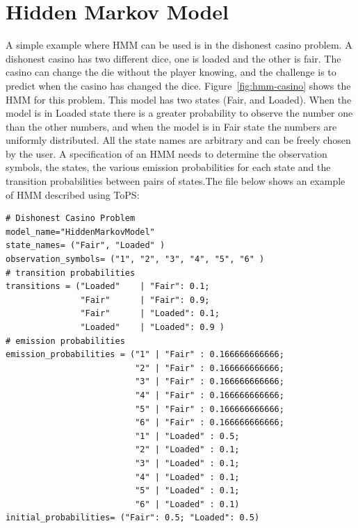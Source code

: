 \section{Hidden Markov Model}

A simple example where HMM can be used is in the dishonest casino problem. A dishonest casino has two different dice, one is loaded and the other is fair. The casino can change the die without the player knowing, and the challenge is to predict when the casino has changed the dice.  Figure~\ref{fig:hmm-casino} shows the HMM for this problem.  This model has two states (Fair, and Loaded). When the model is in Loaded state there is a greater probability to observe the number one than the other numbers,  and when the model is in Fair state the numbers are uniformly distributed. All the state names are arbitrary and can be freely chosen by the user. A specification of an HMM needs to determine the observation symbols, the states, the various emission probabilities for each state and the transition probabilities between pairs of states.The file below shows an example of HMM described using ToPS:


\begin{Verbatim}[frame=single,label="hmm.txt"]
# Dishonest Casino Problem
model_name="HiddenMarkovModel"
state_names= ("Fair", "Loaded" )
observation_symbols= ("1", "2", "3", "4", "5", "6" )
# transition probabilities
transitions = ("Loaded"    | "Fair": 0.1;
               "Fair"      | "Fair": 0.9;
               "Fair"      | "Loaded": 0.1;
               "Loaded"    | "Loaded": 0.9 )
# emission probabilities
emission_probabilities = ("1" | "Fair" : 0.166666666666; 
                          "2" | "Fair" : 0.166666666666;  
                          "3" | "Fair" : 0.166666666666; 
                          "4" | "Fair" : 0.166666666666; 
                          "5" | "Fair" : 0.166666666666; 
                          "6" | "Fair" : 0.166666666666; 
                          "1" | "Loaded" : 0.5;            
                          "2" | "Loaded" : 0.1;            
                          "3" | "Loaded" : 0.1;            
                          "4" | "Loaded" : 0.1;            
                          "5" | "Loaded" : 0.1;            
                          "6" | "Loaded" : 0.1)            
initial_probabilities= ("Fair": 0.5; "Loaded": 0.5)

\end{Verbatim}

